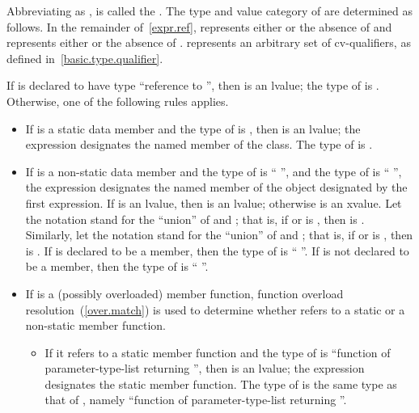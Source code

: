\pnum
Abbreviating 
as ,
 is called the . The
type and value category of  are determined as follows.
In the remainder of~\ref{expr.ref},  represents either
 or the absence of  and  represents
either  or the absence of . 
represents an arbitrary set of cv-qualifiers, as defined
in~\ref{basic.type.qualifier}.

\pnum
If  is declared to have type ``reference to '', then
 is an lvalue; the type of  is .
Otherwise, one of the following rules applies.

\begin{itemize}
\item If  is a static data member and the type of 
is , then  is an lvalue; the expression designates
the named member of the class. The type of  is .

\item If  is a non-static data member and the type of
 is `` '', and the type of 
is `` '', the expression designates the named
member of the object designated by the first expression. If 
is an lvalue, then  is an lvalue;
otherwise  is an xvalue.
Let the notation  stand for the ``union'' of
 and ; that is, if  or 
is , then  is . Similarly,
let the notation  stand for the ``union'' of 
and ; that is, if  or  is
, then  is . If  is
declared to be a  member, then the type of 
is `` ''. If  is not declared to be a
 member, then the type of  is
``  ''.

\item If  is a (possibly overloaded) member function, function
overload resolution~(\ref{over.match}) is used to determine whether
 refers to a static or a non-static member function.

\begin{itemize}
\item If it refers to a static member function and the type of
 is ``function of parameter-type-list returning '',
then  is an lvalue; the expression designates the static
member function. The type of  is the same type as that of
, namely ``function of parameter-type-list returning
''.


\end{itemize}
\end{itemize}
